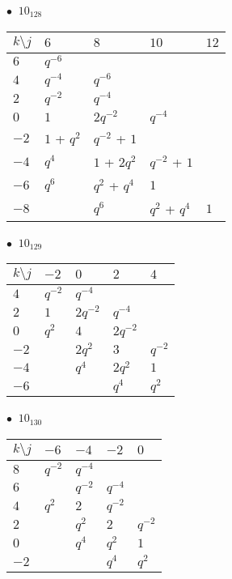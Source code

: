 %
\begin{minipage}{\linewidth}
$\bullet\ $ $10_{128}$ \vspace{0.5em} \\
\begin{tabular}{l|llll}
$k \setminus j$ & $6$ & $8$ & $10$ & $12$ \\
\hline
$6$ & $q^{-6}$ &  &  &  \\
$4$ & $q^{-4}$ & $q^{-6}$ &  &  \\
$2$ & $q^{-2}$ & $q^{-4}$ &  &  \\
$0$ & $1$ & $2q^{-2}$ & $q^{-4}$ &  \\
$-2$ & $1$ + $q^{2}$ & $q^{-2}$ + $1$ &  &  \\
$-4$ & $q^{4}$ & $1$ + $2q^{2}$ & $q^{-2}$ + $1$ &  \\
$-6$ & $q^{6}$ & $q^{2}$ + $q^{4}$ & $1$ &  \\
$-8$ &  & $q^{6}$ & $q^{2}$ + $q^{4}$ & $1$ \\
\end{tabular}
\vspace{2em}
\end{minipage}
%
\begin{minipage}{\linewidth}
$\bullet\ $ $10_{129}$ \vspace{0.5em} \\
\begin{tabular}{l|llll}
$k \setminus j$ & $-2$ & $0$ & $2$ & $4$ \\
\hline
$4$ & $q^{-2}$ & $q^{-4}$ &  &  \\
$2$ & $1$ & $2q^{-2}$ & $q^{-4}$ &  \\
$0$ & $q^{2}$ & $4$ & $2q^{-2}$ &  \\
$-2$ &  & $2q^{2}$ & $3$ & $q^{-2}$ \\
$-4$ &  & $q^{4}$ & $2q^{2}$ & $1$ \\
$-6$ &  &  & $q^{4}$ & $q^{2}$ \\
\end{tabular}
\vspace{2em}
\end{minipage}
%
\begin{minipage}{\linewidth}
$\bullet\ $ $10_{130}$ \vspace{0.5em} \\
\begin{tabular}{l|llll}
$k \setminus j$ & $-6$ & $-4$ & $-2$ & $0$ \\
\hline
$8$ & $q^{-2}$ & $q^{-4}$ &  &  \\
$6$ &  & $q^{-2}$ & $q^{-4}$ &  \\
$4$ & $q^{2}$ & $2$ & $q^{-2}$ &  \\
$2$ &  & $q^{2}$ & $2$ & $q^{-2}$ \\
$0$ &  & $q^{4}$ & $q^{2}$ & $1$ \\
$-2$ &  &  & $q^{4}$ & $q^{2}$ \\
\end{tabular}
\vspace{2em}
\end{minipage}

